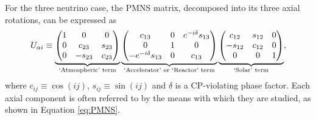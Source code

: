 For the three neutrino case, the PMNS matrix, decomposed into its three axial rotations, can be expressed as
\begin{equation}
  U_{\alpha i} \equiv
  \underbrace{
    \begin{pmatrix}
      1 & 0 & 0 \\
      0 & c_{23} & s_{23} \\
      0 & -s_{23} & c_{23} \\
    \end{pmatrix}
  }_{\textnormal{`Atmospheric' term}}
  \underbrace{
    \begin{pmatrix}
      c_{13} & 0 & e^{-i\delta} s_{13} \\
      0 & 1 & 0 \\
      -e^{-i\delta} s_{13} & 0 & c_{13} \\
    \end{pmatrix}
  }_{\textnormal{`Accelerator' or `Reactor' term}}
  \underbrace{
    \begin{pmatrix}
      c_{12} & s_{12} & 0 \\
      -s_{12} & c_{12} & 0 \\
      0 & 0 & 1 \\
    \end{pmatrix}
  }_{\textnormal{`Solar' term}}
  ,
  \label{eq:PMNS}
\end{equation}
where $c_{ij} \equiv \cos{(ij)}$, $s_{ij} \equiv \sin{(ij)}$ and $\delta$ is a CP-violating phase factor.  Each axial component is often referred to by the means with which they are studied, as shown in Equation \ref{eq:PMNS}.

